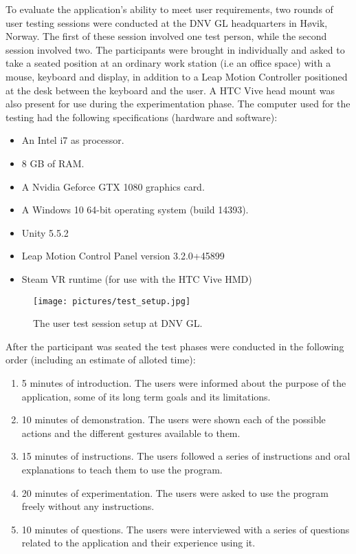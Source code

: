 
To evaluate the application's ability to meet user requirements, two rounds of user testing sessions were conducted at the DNV GL headquarters in Høvik, Norway.
The first of these session involved one test person, while the second session involved two. 
The participants were brought in individually and asked to take a seated position at an ordinary work station (i.e an office space) with a mouse, keyboard and display, 
in addition to a Leap Motion Controller positioned at the desk between the keyboard and the user. A HTC Vive head mount was also present for use during the experimentation phase. 
The computer used for the testing had the following specifications (hardware and software):

\begin{itemize}
    \item An Intel i7 as processor.
    \item 8 GB of RAM.
    \item A Nvidia Geforce GTX 1080 graphics card.
    \item A Windows 10 64-bit operating system (build 14393).
    \item Unity 5.5.2
    \item Leap Motion Control Panel version 3.2.0+45899
    \item Steam VR runtime (for use with the HTC Vive HMD)
\end{itemize}

\begin{figure}%
	\texttt{[image: pictures/test\_setup.jpg]}
	\caption[The user test session setup.]{The user test session setup at DNV GL. }
	\label{fig:test_setup}
\end{figure} 

After the participant was seated the test phases were conducted in the following order (including an estimate of alloted time):

\begin{enumerate}
    \item  5 minutes of introduction. The users were informed about the purpose of the application, some of its long term goals and its limitations.
    \item 10 minutes of demonstration. The users were shown each of the possible actions and the different gestures available to them.
    \item 15 minutes of instructions. The users followed a series of instructions and oral explanations to teach them to use the program.
    \item 20 minutes of experimentation. The users were asked to use the program freely without any instructions.  
    \item 10 minutes of questions. The users were interviewed with a series of questions related to the application and their experience using it.   
\end{enumerate}

